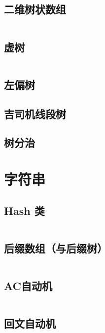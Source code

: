 \documentclass[10pt, a4paper, oneside]{ctexart}
\begin{document}
\begin{multicols}{2}
        \subsection{二维树状数组}
        \inputminted{cpp}{src/data structure/2D-BIT.cpp}
        \subsection{虚树}
        \inputminted{cpp}{src/data structure/virtual-tree.cpp}
        \subsection{左偏树}
        
        \subsection{吉司机线段树}
        
        \subsection{树分治}
        

        
        \section{字符串}
        \subsection{Hash 类}
        \inputminted{cpp}{src/string/hash.cpp}
        \subsection{后缀数组（与后缀树）}
        \inputminted{cpp}{src/string/SA.cpp}
        \subsection{AC自动机}
        \inputminted{cpp}{src/string/ACAM.cpp}
        \subsection{回文自动机}
        \inputminted{cpp}{src/string/PAM.cpp}

\end{multicols}
\end{document}
